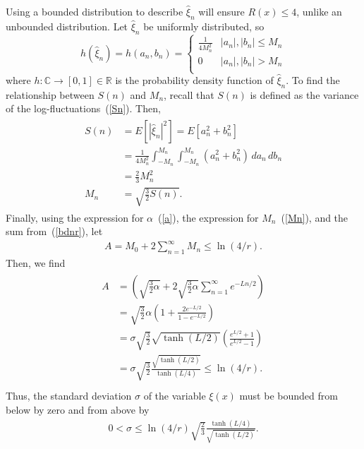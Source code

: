 Using a bounded distribution to describe $\hat{\xi}_n$ will ensure
$R(x) \leq 4$, unlike an unbounded distribution. Let $\hat{\xi}_n$ be uniformly distributed, so 
\begin{equation}\label{eq:square}
   h(\hat{\xi}_n) =h(a_n,b_n)= \left\{
     \begin{array}{lr}
       \frac{1}{4 M_n^2} & |a_n|,|b_n| \leq M_n\\
       0 & |a_n|,|b_n| > M_n\\
     \end{array}
   \right.
\end{equation} 
where $h:\mathbb{C}\to [0,1]\in \mathbb{R}$ is the probability density
function of $\hat{\xi}_n$. To find the relationship between $S(n)$ and
$M_n$, recall that $S(n)$ is defined as the variance of the
log-fluctuations~(\ref{Sn}). Then, 
\begin{align}
\begin{split}\label{Mn}
S(n)&=E[|\hat{\xi}_n|^2] = E[a_n^2+b_n^2]\\
 &= \frac{1}{4M_n^2}\int_{-M_n}^{M_n}\int_{-M_n}^{M_n}(a_n^2+b_n^2)\,da_n\,db_n\\
&=\frac{2}{3}M_n^2\\
M_n&=\sqrt{\frac{3}{2}S(n)}.
\end{split}
\end{align}
Finally, using the expression for $\alpha$~(\ref{a}), the
expression for $M_n$~(\ref{Mn}), and the sum from~(\ref{bdnr}), let
\begin{align*}
A = M_0+2\sum_{n=1}^\infty M_n \leq \ln(4/r).
\end{align*}
Then, we find
\begin{align*}
\begin{split}
A &=\left(\sqrt{\frac{3}{2}\alpha} +
2\sqrt{\frac{3}{2}\alpha}\sum_{n=1}^{\infty}e^{-Ln/2}\right) \\
&= \sqrt{\frac{3}{2}}\alpha\left(1+ \frac{2e^{-L/2}}{1-e^{-L/2}} \right)\\
&= \sigma\sqrt{\frac{3}{2}}
\sqrt{\tanh(L/2)}\left(\frac{e^{L/2}+1}{e^{L/2}-1} \right)\\
&= \sigma \sqrt{\frac{3}{2}}\frac{\sqrt{\tanh(L/2)}}{\tanh(L/4)} \leq \ln(4/r).\\
\end{split}
\end{align*}
Thus, the standard deviation $\sigma$ of the variable $\xi(x)$ must be bounded from below by
zero and from above by
\begin{align}\label{sigma}
0<\sigma \leq \ln(4/r)\sqrt{\frac{2}{3}}\frac{\tanh(L/4)}{\sqrt{\tanh(L/2)}}.
\end{align}
